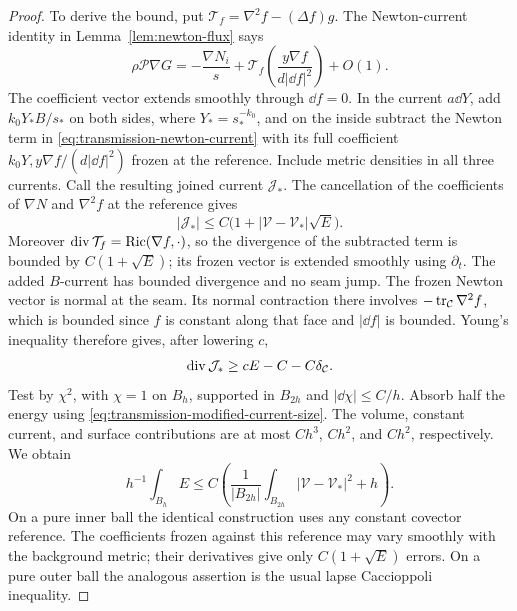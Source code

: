 \begin{proof}
To derive the bound, put
$\mathcal T_f=\nabla^2f-(\Delta f)g$.  The Newton-current identity in
Lemma~\ref{lem:newton-flux} says
\begin{equation}
 \rho\mathcal P\nabla G
 =-\frac{\nabla N_i}{s}
   +\mathcal T_f\left(\frac{y\nabla f}{d|\dd f|^2}\right)+O(1).
 \label{eq:transmission-newton-current}
\end{equation}
The coefficient vector extends smoothly through $\dd f=0$.  In the
current $a\dd Y$, add $k_0Y_*B/s_*$ on both sides, where
$Y_*=s_*^{-k_0}$, and on the inside subtract the Newton term in
\eqref{eq:transmission-newton-current} with its full coefficient
$k_0Y,y\nabla f/(d|\dd f|^2)$ frozen at the reference.  Include metric
densities in all three currents.  Call the resulting joined current
$\mathcal J_*$.  The cancellation of the coefficients of $\nabla N$
and $\nabla^2f$ at the reference gives
\begin{equation}
 |\mathcal J_*|\leq C\bigl(1+|\mathcal V-\mathcal V_*|\sqrt E\bigr).
 \label{eq:transmission-modified-current-size}
\end{equation}
Moreover $\operatorname{div}\mathcal T_f=\operatorname{Ric}(\nabla f,\cdot)$, so the divergence
of the subtracted term is bounded by $C(1+\sqrt E)$; its frozen vector
is extended smoothly using $\partial_t$.  The added $B$-current has
bounded divergence and no seam jump.  The frozen Newton vector is normal
at the seam.  Its normal contraction there involves
$-\operatorname{tr}_{\mathcal C}\nabla^2f$, which is bounded since $f$ is constant
along that face and $|\dd f|$ is bounded.  Young's inequality therefore
gives, after lowering $c$,
\begin{equation}
 \operatorname{div}\mathcal J_*\geq cE-C-C\delta_{\mathcal C}.
 \label{eq:transmission-modified-current-divergence}
\end{equation}
Test by $\chi^2$, with $\chi=1$ on $B_h$, supported in $B_{2h}$ and
$|\dd\chi|\leq C/h$.  Absorb half the energy using
\eqref{eq:transmission-modified-current-size}.  The volume, constant
current, and surface contributions are at most $Ch^3$, $Ch^2$, and
$Ch^2$, respectively.  We obtain
\begin{equation}
 h^{-1}\int_{B_h}E\leq
 C\left(\frac{1}{|B_{2h}|}\int_{B_{2h}}
                    |\mathcal V-\mathcal V_*|^2+h\right).
 \label{eq:transmission-caccioppoli}
\end{equation}
On a pure inner ball the identical construction uses any constant
covector reference.  The coefficients frozen against this reference may
vary smoothly with the background metric; their derivatives give only
$C(1+\sqrt E)$ errors.  On a pure outer ball the analogous assertion
is the usual lapse Caccioppoli inequality.


\end{proof}
